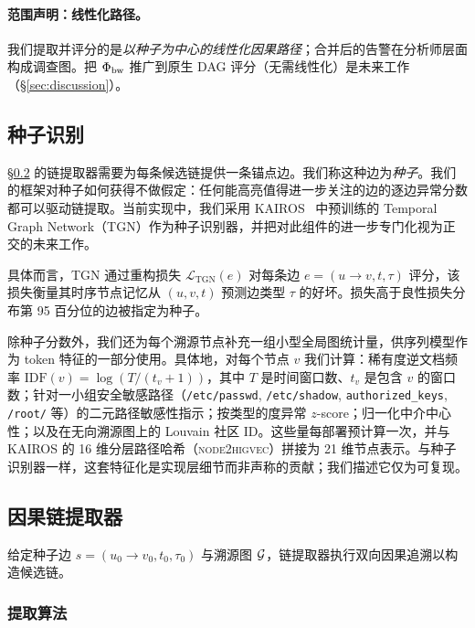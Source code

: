 \paragraph{范围声明：线性化路径。}我们提取并评分的是\emph{以种子为中心的线性化因果路径}；合并后的告警在分析师层面构成调查图。把 $\Phi_{\text{bw}}$ 推广到原生 DAG 评分（无需线性化）是未来工作（\S\ref{sec:discussion}）。

\subsection{种子识别}
\label{sec:seed}

\S\ref{sec:extractor} 的链提取器需要为每条候选链提供一条锚点边。我们称这种边为\emph{种子}。我们的框架对种子如何获得不做假定：任何能高亮值得进一步关注的边的逐边异常分数都可以驱动链提取。当前实现中，我们采用 KAIROS~\cite{cheng2024kairos} 中预训练的 Temporal Graph Network（TGN）作为种子识别器，并把对此组件的进一步专门化视为正交的未来工作。

具体而言，TGN 通过重构损失 $\mathcal{L}_{\text{TGN}}(e)$ 对每条边 $e = (u \rightarrow v, t, \tau)$ 评分，该损失衡量其时序节点记忆从 $(u, v, t)$ 预测边类型 $\tau$ 的好坏。损失高于良性损失分布第 95 百分位的边被指定为种子。

除种子分数外，我们还为每个溯源节点补充一组小型全局图统计量，供序列模型作为 token 特征的一部分使用。具体地，对每个节点 $v$ 我们计算：稀有度逆文档频率 $\text{IDF}(v) = \log(T / (t_v + 1))$，其中 $T$ 是时间窗口数、$t_v$ 是包含 $v$ 的窗口数；针对一小组安全敏感路径（\texttt{/etc/passwd}, \texttt{/etc/shadow}, \texttt{authorized\_keys}, \texttt{/root/} 等）的二元路径敏感性指示；按类型的度异常 $z$-score；归一化中介中心性；以及在无向溯源图上的 Louvain 社区 ID。这些量每部署预计算一次，并与 KAIROS 的 16 维分层路径哈希（\textsc{node2higvec}）拼接为 21 维节点表示。与种子识别器一样，这套特征化是实现层细节而非声称的贡献；我们描述它仅为可复现。

\subsection{因果链提取器}
\label{sec:extractor}

给定种子边 $s = (u_0 \rightarrow v_0, t_0, \tau_0)$ 与溯源图 $\mathcal{G}$，链提取器执行双向因果追溯以构造候选链。

\subsubsection{提取算法}

